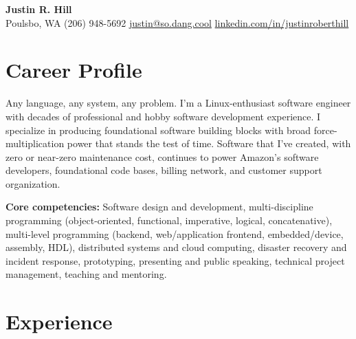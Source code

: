 \documentclass[11pt,letterpaper]{article}
\begin{document}
\begin{center}
  {\Huge\bfseries Justin R. Hill}\\[0.4em]
  Poulsbo, WA \quad\textbar\quad
  (206) 948-5692 \quad\textbar\quad
  \href{mailto:justin@so.dang.cool}{justin@so.dang.cool} \quad\textbar\quad
  \href{https://linkedin.com/in/justinroberthill}{linkedin.com/in/justinroberthill}
\end{center}

\section*{Career Profile}

Any language, any system, any problem. I'm a Linux-enthusiast software engineer with decades of professional and hobby software development experience. I specialize in producing foundational software building blocks with broad force-multiplication power that stands the test of time. Software that I've created, with zero or near-zero maintenance cost, continues to power Amazon's software developers, foundational code bases, billing network, and customer support organization.

\textbf{Core competencies:} Software design and development, multi-discipline programming (object-oriented, functional, imperative, logical, concatenative), multi-level programming (backend, web/application frontend, embedded/device, assembly, HDL), distributed systems and cloud computing, disaster recovery and incident response, prototyping, presenting and public speaking, technical project management, teaching and mentoring.

\section*{Experience}
\end{document}
